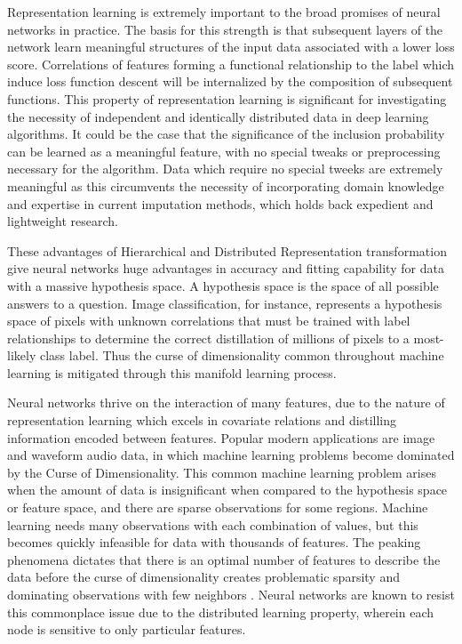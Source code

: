 \documentclass[12pt,twoside]{reedthesis}
\begin{document}
Representation learning is extremely important to the broad promises of
neural networks in practice. The basis for this strength is that
subsequent layers of the network learn meaningful structures of the
input data associated with a lower loss score. Correlations of features
forming a functional relationship to the label which induce loss
function descent will be internalized by the composition of subsequent
functions. This property of representation learning is significant for
investigating the necessity of independent and identically distributed
data in deep learning algorithms. It could be the case that the
significance of the inclusion probability can be learned as a meaningful
feature, with no special tweaks or preprocessing necessary for the
algorithm. Data which require no special tweeks are extremely meaningful
as this circumvents the necessity of incorporating domain knowledge and
expertise in current imputation methods, which holds back expedient and
lightweight research.

These advantages of Hierarchical and Distributed Representation
transformation give neural networks huge advantages in accuracy and
fitting capability for data with a massive hypothesis space. A
hypothesis space is the space of all possible answers to a question.
Image classification, for instance, represents a hypothesis space of
pixels with unknown correlations that must be trained with label
relationships to determine the correct distillation of millions of
pixels to a most-likely class label. Thus the curse of dimensionality
common throughout machine learning is mitigated through this manifold
learning process.

Neural networks thrive on the interaction of many features, due to the
nature of representation learning which excels in covariate relations
and distilling information encoded between features. Popular modern
applications are image and waveform audio data, in which machine
learning problems become dominated by the Curse of Dimensionality. This
common machine learning problem arises when the amount of data is
insignificant when compared to the hypothesis space or feature space,
and there are sparse observations for some regions. Machine learning
needs many observations with each combination of values, but this
becomes quickly infeasible for data with thousands of features. The
peaking phenomena dictates that there is an optimal number of features
to describe the data before the curse of dimensionality creates
problematic sparsity and dominating observations with few neighbors .
Neural networks are known to resist this commonplace issue due to the
distributed learning property, wherein each node is sensitive to only
particular features.
\end{document}
